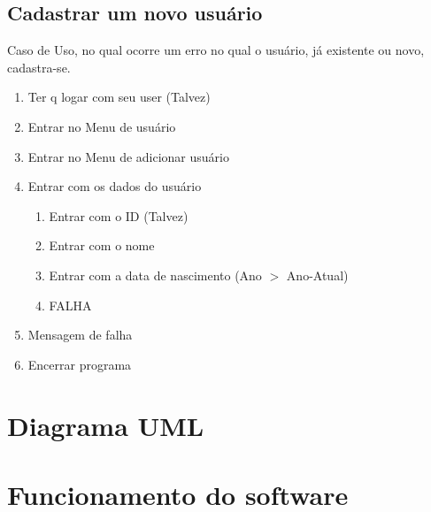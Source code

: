 \documentclass[12pt, a4paper]{article}
\begin{document}
\subsection{Cadastrar um novo usuário}
	Caso de Uso, no qual ocorre um erro no qual o usuário, já existente ou novo, cadastra-se.
\begin{enumerate}
	\item Ter q logar com seu user (Talvez)
	\item Entrar no Menu de usuário
	\item Entrar no Menu de adicionar usuário
	\item Entrar com os dados do usuário
		\begin{enumerate}
			\item Entrar com o ID (Talvez)
			\item Entrar com o nome
			\item Entrar com a data de nascimento (Ano $>$ Ano-Atual)
			\item FALHA
		\end{enumerate}
	\item Mensagem de falha
	\item Encerrar programa
	
\end{enumerate}

\section{Diagrama UML}

\section{Funcionamento do software}
\end{document}
